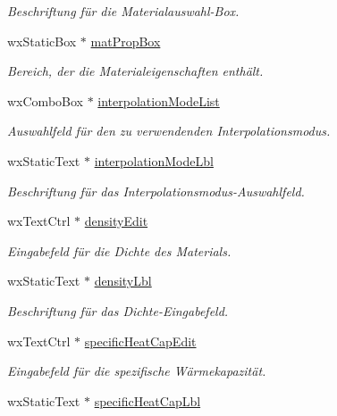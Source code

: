 \begin{DoxyCompactItemize}
\begin{DoxyCompactList}\small\item\em Beschriftung für die Materialauswahl-\/\-Box. \end{DoxyCompactList}\item 
wx\-Static\-Box $\ast$ \hyperlink{classPropertiesBox_a1ff3669bf863d80a26d2d9874b1868e1}{mat\-Prop\-Box}
\begin{DoxyCompactList}\small\item\em Bereich, der die Materialeigenschaften enthält. \end{DoxyCompactList}\item 
wx\-Combo\-Box $\ast$ \hyperlink{classPropertiesBox_a3f5165a466fd9204f758a6fbb17507ae}{interpolation\-Mode\-List}
\begin{DoxyCompactList}\small\item\em Auswahlfeld für den zu verwendenden Interpolationsmodus. \end{DoxyCompactList}\item 
wx\-Static\-Text $\ast$ \hyperlink{classPropertiesBox_a7184c404a73e32cee30ac299ef9fe649}{interpolation\-Mode\-Lbl}
\begin{DoxyCompactList}\small\item\em Beschriftung für das Interpolationsmodus-\/\-Auswahlfeld. \end{DoxyCompactList}\item 
wx\-Text\-Ctrl $\ast$ \hyperlink{classPropertiesBox_a0c71f6f0ea002a57ac0750e8ae9cdf13}{density\-Edit}
\begin{DoxyCompactList}\small\item\em Eingabefeld für die Dichte des Materials. \end{DoxyCompactList}\item 
wx\-Static\-Text $\ast$ \hyperlink{classPropertiesBox_a1c670a16a13cb03338867a35508f7f5a}{density\-Lbl}
\begin{DoxyCompactList}\small\item\em Beschriftung für das Dichte-\/\-Eingabefeld. \end{DoxyCompactList}\item 
wx\-Text\-Ctrl $\ast$ \hyperlink{classPropertiesBox_a7058b344520a2d9ba42fe9e9c1080faa}{specific\-Heat\-Cap\-Edit}
\begin{DoxyCompactList}\small\item\em Eingabefeld für die spezifische Wärmekapazität. \end{DoxyCompactList}\item 
wx\-Static\-Text $\ast$ \hyperlink{classPropertiesBox_ad49b95cb856e5f18d6717fc99ccd7b0b}{specific\-Heat\-Cap\-Lbl}

\end{DoxyCompactItemize}
